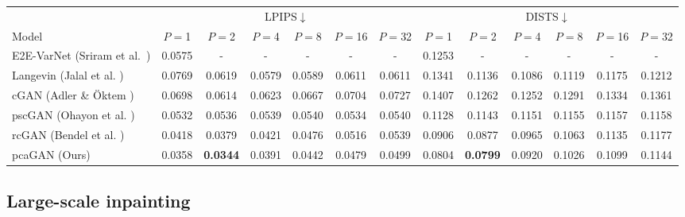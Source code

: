 \documentclass{article}
\theoremstyle{plain}
\theoremstyle{definition}
\theoremstyle{remark}
\begin{document}
\begin{table}[t]
{\begin{tabular}{lcccccccccccc}
    & \multicolumn{6}{c}{LPIPS$\downarrow$} 
        & \multicolumn{6}{c}{DISTS$\downarrow$}\\ 
    \cmidrule(lr){2-7} \cmidrule(lr){8-13}
    Model & $P\!=$1 & $P\!=$2 & $P\!=$4 & $P\!=$8 & $P\!=$16 & $P\!=$32
          & $P\!=$1 & $P\!=$2 & $P\!=$4 & $P\!=$8 & $P\!=$16 & $P\!=$32\\
    \midrule
    E2E-VarNet (Sriram et al.\ \cite{Sriram:MICCAI:20}) & 0.0575 & - & - & - & - & - & 0.1253 & - & - & - & - & -\\
    Langevin (Jalal et al. \cite{Jalal:NIPS:21}) 
          & 0.0769 & 0.0619 & 0.0579 & 0.0589 & 0.0611 & 0.0611
          & 0.1341 & 0.1136 & 0.1086 & 0.1119 & 0.1175 & 0.1212\\
    cGAN (Adler \& \"Oktem \cite{Adler:18}) 
          & 0.0698 & 0.0614 & 0.0623 & 0.0667 & 0.0704 & 0.0727
          & 0.1407 & 0.1262 & 0.1252 & 0.1291 & 0.1334 & 0.1361\\
    pscGAN (Ohayon et al. \cite{Ohayon:ICCVW:21}) 
          & 0.0532 & 0.0536 & 0.0539 & 0.0540 & 0.0534 & 0.0540
          & 0.1128 & 0.1143 & 0.1151 & 0.1155 & 0.1157 & 0.1158\\
    rcGAN (Bendel et al. \cite{Bendel:NIPS:23}) 
          & 0.0418 & 0.0379 & 0.0421 & 0.0476 & 0.0516 & 0.0539
          & 0.0906 & 0.0877 & 0.0965 & 0.1063 & 0.1135 & 0.1177\\
    pcaGAN (Ours) & 0.0358 & \bf 0.0344 & 0.0391 & 0.0442 & 0.0479 & 0.0499 &  0.0804 & \bf 0.0799 & 0.0920 & 0.1026 & 0.1099 & 0.1144\\
    \bottomrule
  \end{tabular}%
  }
\end{table}

\subsection{Large-scale inpainting} \label{sec:inpainting}
\end{document}
